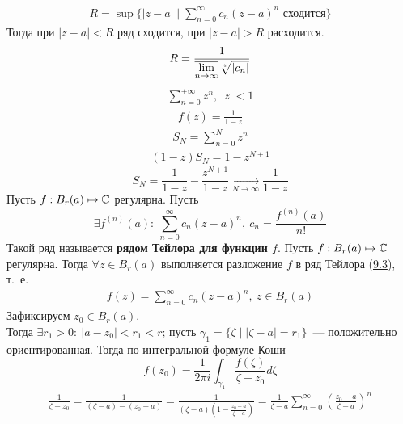 \begin{align*}
  R = \sup\{\left| z-a \right|\mid \sum_{n=0}^{\infty}c_n(z-a)^n \text{ сходится}\}
\end{align*}
Тогда при $\left| z-a \right|<R$ ряд сходится, при $\left| z-a \right|>R$
расходится.
\begin{align*}
  R = \frac{1}{\overline{\displaystyle \lim_{n \to \infty}} \sqrt[n]{\left| c_n \right|}}
\end{align*}
\example
\begin{align*}
  \sum_{n=0}^{+\infty}z^n, \ \left| z \right|< 1
\end{align*}
\begin{align*}
  f(z) = \frac{1}{1-z}
\end{align*}
\begin{align*}
  S_N = \sum_{n=0}^Nz^n
\end{align*}
\begin{align*}
  (1-z)S_N = 1- z^{N+1}
\end{align*}
\begin{equation}\label{(9.2)}
  S_N = \frac{1}{1-z} - \frac{z^{N+1}}{1-z} \underset{N \to \infty}{\to} \frac{1}{1-z}
\end{equation}
\Def
Пусть $f: B_r(a) \mapsto \mathbb{C}$ регулярна. Пусть
\begin{equation}\label{(9.3)}
    \exists f^{(n)}(a): \ \sum_{n=0}^{\infty}c_n(z-a)^n, \ c_n = \frac{f^{(n)}(a)}{n!}
\end{equation}
Такой ряд называется \textbf{рядом Тейлора для функции $f$}.
\theorem
Пусть $f: B_r(a) \mapsto \mathbb{C}$ регулярна. Тогда $\forall z \in B_r(a)$
выполняется разложение $f$ в ряд Тейлора (\href{(9.3)}{9.3}), т.~е.
\begin{align*}
  f(z)= \sum_{n=0}^{\infty}c_n(z-a)^n, \ z \in B_r(a)
\end{align*}
\pr
Зафиксируем $z_0 \in B_r(a)$.
\\
Тогда $\exists r_1 > 0: \ \left| a-z_0 \right|<r_1<r$; пусть $\gamma_1 = \{\zeta
\mid \left| \zeta - a \right| = r_1\}$~--- положительно ориентированная. Тогда
по интегральной формуле Коши
\begin{equation}\label{(9.4)}
  f(z_0) = \frac{1}{2 \pi i} \int_{\gamma_1}\frac{f(\zeta)}{\zeta - z_0} d \zeta 
\end{equation}
\begin{align*}
  \frac{1}{\zeta - z_0} = \frac{1}{(\zeta - a) - (z_0 - a)} = \frac{1}{(\zeta - a)\left( 1-\frac{z_0-a}{\zeta - a} \right)} = \frac{1}{\zeta - a} \sum_{n=0}^{\infty}\left( \frac{z_0-a}{\zeta - a} \right)^n
\end{align*}
